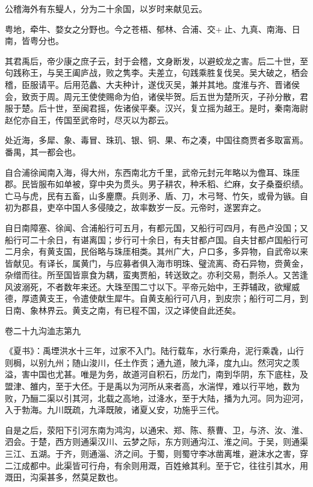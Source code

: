 \documentclass[12pt,UTF8]{ctexbook}
\begin{document}
公稽海外有东鳀人，分为二十余国，以岁时来献见云。



粤地，牵牛、婺女之分野也。今之苍梧、郁林、合浦、交+止、九真、南海、日南，皆粤分也。



其君禹后，帝少康之庶子云，封于会稽，文身断发，以避蛟龙之害。后二十世，至句践称王，与吴王阖庐战，败之隽李。夫差立，句践乘胜复伐吴。吴大破之，栖会稽，臣服请平。后用范蠡、大夫种计，遂伐灭吴，兼并其地。度淮与齐、晋诸侯会，致贡于周。周元王使使赐命为伯，诸侯毕贺。后五世为楚所灭，子孙分散，君服于楚。后十世，至闽君摇，佐诸侯平秦。汉兴，复立摇为越王。是时，秦南海尉赵佗亦自王，传国至武帝时，尽灭以为郡云。



处近海，多犀、象、毒冒、珠玑、银、铜、果、布之凑，中国往商贾者多取富焉。番禺，其一都会也。



自合浦徐闻南入海，得大州，东西南北方千里，武帝元封元年略以为儋耳、珠厓郡。民皆服布如单被，穿中央为贯头。男子耕农，种禾稻、纻麻，女子桑蚕织绩。亡马与虎，民有五畜，山多麈麖。兵则矛、盾、刀，木弓弩、竹矢，或骨为镞。自初为郡县，吏卒中国人多侵陵之，故率数岁一反。元帝时，遂罢弃之。



自日南障塞、徐闻、合浦船行可五月，有都元国，又船行可四月，有邑卢没国；又船行可二十余日，有谌离国；步行可十余日，有夫甘都卢国。自夫甘都卢国船行可二月余，有黄支国，民俗略与珠厓相类。其州广大，户口多，多异物，自武帝以来皆献见。有译长，属黄门，与应募者俱入海市明珠、璧流离、奇石异物，赍黄金，杂缯而往。所至国皆禀食为耦，蛮夷贾船，转送致之。亦利交易，剽杀人。又苦逢风波溺死，不者数年来还。大珠至围二寸以下。平帝元始中，王莽辅政，欲耀威德，厚遗黄支王，令遣使献生犀牛。自黄支船行可八月，到皮宗；船行可二月，到日南、象林界云。黄支之南，有已程不国，汉之译使自此还矣。





卷二十九沟洫志第九



《夏书》：禹堙洪水十三年，过家不入门。陆行载车，水行乘舟，泥行乘毳，山行则梮，以别九州；随山浚川，任土作贡；通九道，陂九泽，度九山。然河灾之羡溢，害中国也尤甚。唯是为务，故道河自积石，历龙门，南到华阴，东下底柱，及盟津、雒内，至于大伾。于是禹以为河所从来者高，水湍悍，难以行平地，数为败，乃酾二渠以引其河，北载之高地，过洚水，至于大陆，播为九河。同为迎河，入于勃海。九川既疏，九泽既陂，诸夏乂安，功施乎三代。



自是之后，荥阳下引河东南为鸿沟，以通宋、郑、陈、蔡曹、卫，与济、汝、淮、泗会。于楚，西方则通渠汉川、云梦之际，东方则通沟江、淮之间。于吴，则通渠三江、五湖。于齐，则通淄、济之间。于蜀，则蜀守李冰凿离堆，避沫水之害，穿二江成都中。此渠皆可行舟，有余则用溉，百姓飨其利。至于它，往往引其水，用溉田，沟渠甚多，然莫足数也。
\end{document}
